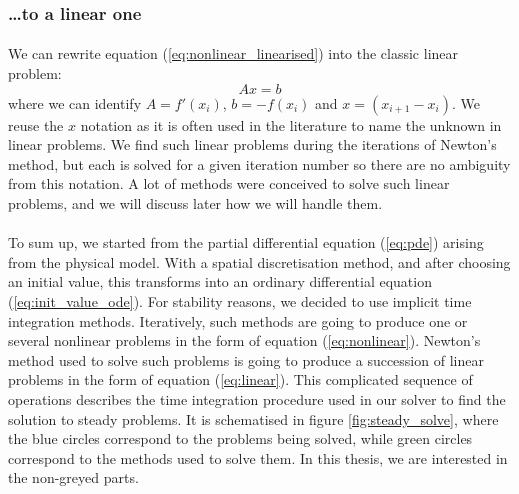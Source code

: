      \subsubsection{\dots to a linear one}

        \paragraph{}
        We can rewrite equation (\ref{eq:nonlinear_linearised}) into the classic linear problem:
        \begin{equation}\label{eq:linear}
          Ax = b
        \end{equation}
        where we can identify $A = f'\left(x_i\right)$, $b = -f\left(x_i\right)$ and $x = \left( x_{i+1} - x_i \right)$.
        We reuse the $x$ notation as it is often used in the literature to name the unknown in linear problems.
        We find such linear problems during the iterations of Newton's method, but each is solved for a given iteration number so there are no ambiguity from this notation.
        A lot of methods were conceived to solve such linear problems, and we will discuss later how we will handle them.


      \paragraph{}
      To sum up, we started from the partial differential equation (\ref{eq:pde}) arising from the physical model.
      With a spatial discretisation method, and after choosing an initial value, this transforms into an ordinary differential equation (\ref{eq:init_value_ode}).
      For stability reasons, we decided to use implicit time integration methods.
      Iteratively, such methods are going to produce one or several nonlinear problems in the form of equation (\ref{eq:nonlinear}).
      Newton's method used to solve such problems is going to produce a succession of linear problems in the form of equation (\ref{eq:linear}).
      This complicated sequence of operations describes the time integration procedure used in our solver to find the solution to steady problems.
      It is schematised in figure \ref{fig:steady_solve}, where the blue circles correspond to the problems being solved, while green circles correspond to the methods used to solve them.
      In this thesis, we are interested in the non-greyed parts.


